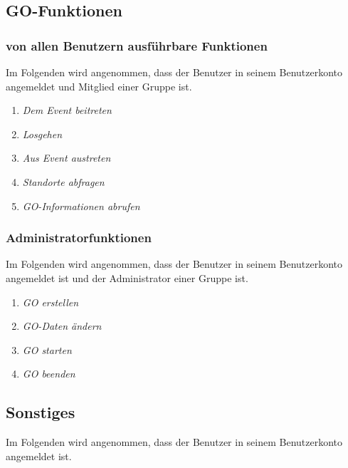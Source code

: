 \documentclass[parskip=full]{scrartcl}
\def\threedigits#1{%
  \ifnum#1<100 0\fi
  \ifnum#1<10 0\fi
  \number#1}
\begin{document}
\subsection{GO-Funktionen}

\subsubsection{von allen Benutzern ausführbare Funktionen}
Im Folgenden wird angenommen, dass der Benutzer in seinem Benutzerkonto angemeldet und Mitglied einer Gruppe ist.

\begin{enumerate}[label={\textbf{/F\protect\threedigits{\theenumi}0/}}, leftmargin=*, resume]	
	\item \textit{Dem Event beitreten}
	\item \textit{Losgehen}
	\item \textit{Aus Event austreten}
	\item \textit{Standorte abfragen} %
	\item \textit{GO-Informationen abrufen}
\end{enumerate}

\subsubsection{Administratorfunktionen}
Im Folgenden wird angenommen, dass der Benutzer in seinem Benutzerkonto angemeldet ist und der Administrator einer Gruppe ist.

\begin{enumerate}[label={\textbf{/F\protect\threedigits{\theenumi}0/}}, leftmargin=*, resume]	
	\item \textit{GO erstellen}
	\item \textit{GO-Daten ändern} %
	\item \textit{GO starten}
	\item \textit{GO beenden}
\end{enumerate}

\subsection{Sonstiges}
Im Folgenden wird angenommen, dass der Benutzer in seinem Benutzerkonto angemeldet ist.
\end{document}

